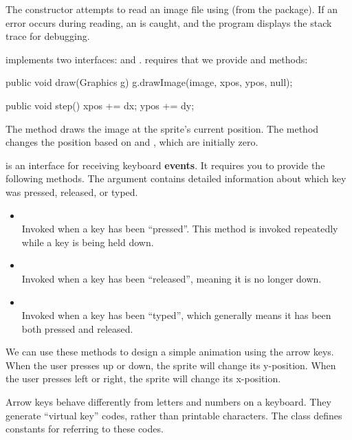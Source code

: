 The constructor attempts to read an image file using  (from the  package).
If an error occurs during reading, an  is caught, and the program displays the stack trace for debugging.

 implements two interfaces:  and .
 requires that we provide  and  methods:

\begin{code}
public void draw(Graphics g) {
    g.drawImage(image, xpos, ypos, null);
}

public void step() {
    xpos += dx;
    ypos += dy;
}
\end{code}

The  method draws the image at the sprite's current position.
The  method changes the position based on  and , which are initially zero.


 is an interface for receiving keyboard {\bf events}.
It requires you to provide the following methods.
The  argument contains detailed information about which key was pressed, released, or typed.

\begin{itemize}

\item {}
\\ Invoked when a key has been ``pressed''.
This method is invoked repeatedly while a key is being held down.

\item {}
\\ Invoked when a key has been ``released'', meaning it is no longer down.

\item {}
\\ Invoked when a key has been ``typed'', which generally means it has been both pressed and released.

\end{itemize}

We can use these methods to design a simple animation using the arrow keys.
When the user presses up or down, the sprite will change its y-position.
When the user presses left or right, the sprite will change its x-position.

Arrow keys behave differently from letters and numbers on a keyboard.
They generate ``virtual key'' codes, rather than printable characters.
The  class defines constants for referring to these codes.

